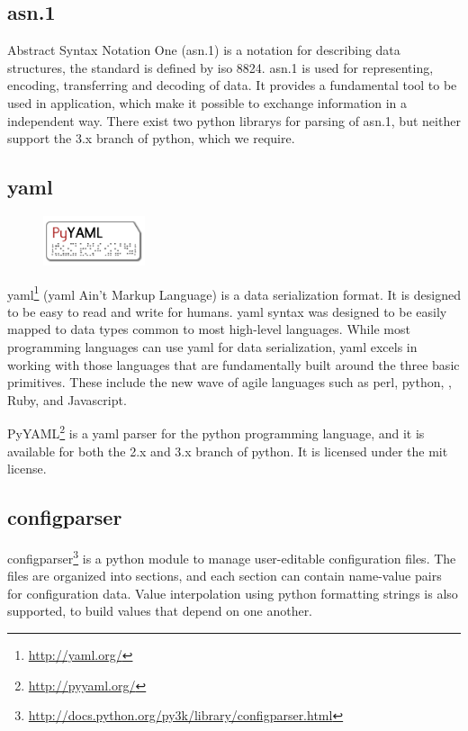 \subsection{\Gls{asn.1}}
Abstract Syntax Notation One (\Gls{asn.1}) is a notation for describing data
structures, the standard is defined by \Gls{iso} 8824. \Gls{asn.1} is used for
representing, encoding, transferring and decoding of data. It provides a
fundamental tool to be used in application, which make it possible to exchange
information in a independent way. There exist two \Gls{python} \glspl{library} for parsing
of  \Gls{asn.1}, but neither support the 3.x \gls{branch} of \Gls{python}, which we require.

\subsection{\Gls{yaml}}
\label{sec:pre:yaml}
\begin{figure}
	\vspace{-30pt}
	\includegraphics[width=3cm]{./planning/img/pyyaml_logo}
	\vspace{-30pt}
\end{figure}
\Gls{yaml}\footnote{\url{http://yaml.org/}} (\Gls{yaml} Ain't Markup Language) is a \gls{data serialization} format.
It is designed to be easy to read and write for humans.
\Gls{yaml} syntax was designed to be easily mapped to data types common to most
high-level languages. While most programming languages can use \Gls{yaml} for data
serialization, \Gls{yaml} excels in working with those languages that are
fundamentally built around the three basic primitives. These include the new
wave of agile languages such as \Gls{perl}, \Gls{python}, , \Gls{Ruby}, and \Gls{Javascript}.

PyYAML\footnote{\url{http://pyyaml.org/}} is a \Gls{yaml} \gls{parser} for the \Gls{python}
programming language, and it is available for both the 2.x and 3.x \gls{branch} of
\Gls{python}. It is licensed under the \Gls{mit} license.

\subsection{configparser}
configparser\footnote{\url{http://docs.python.org/py3k/library/configparser.html}}
is a \Gls{python} module to manage user-editable configuration files. The
files are organized into sections, and each section can contain name-value
pairs for configuration data. Value interpolation using \Gls{python} formatting
strings is also supported, to build values that depend on one another.

